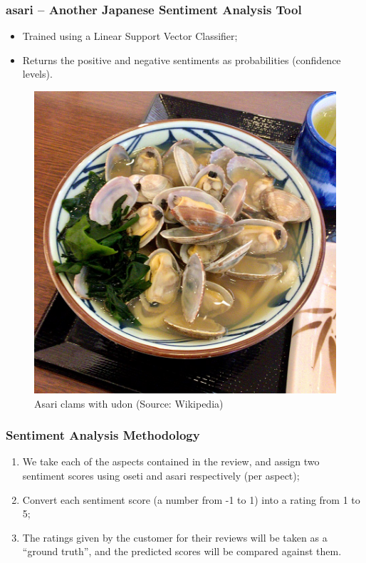 \documentclass[11pt]{beamer}
\begin{document}
	\begin{frame}
		\frametitle{asari -- Another Japanese Sentiment Analysis Tool}
		\begin{itemize}
			\item Trained using a Linear Support Vector Classifier;
			\pause
			\item Returns the positive and negative sentiments as probabilities (confidence levels).
		\end{itemize}
		\pause
		\begin{figure}
			\begin{center}
				\includegraphics[scale=0.13]{asari_udon}
			\end{center}
			\caption{Asari clams with udon (Source: Wikipedia)}
		\end{figure}
	\end{frame}
	
	\begin{frame}
		\frametitle{Sentiment Analysis Methodology}
		\begin{enumerate}
			\item We take each of the aspects contained in the review, and assign two sentiment scores using oseti and asari respectively (per aspect);
			\pause
			\item Convert each sentiment score (a number from -1 to 1) into a rating from 1 to 5;
			\pause
			\item The ratings given by the customer for their reviews will be taken as a ``ground truth'', and the predicted scores will be compared against them.
		\end{enumerate}
	\end{frame}
	
\end{document}
